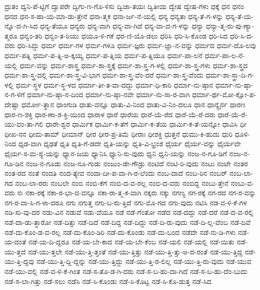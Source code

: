 {ದ್ರುತಂ
ದ್ವನಿ-ಪೆ-ಟ್ಟಿಗೆ
ದ್ವಾಪರೇ
ದ್ವಿಗು-ಣ-ಗೊ-ಳಿಸು
ದ್ವಿಜಾ-ತಯಃ
ದ್ವಿತೀಯ
ದ್ವೇಷ
ದ್ವೇಷ-ಗಳು
ಧಕ್ಕೆ
ಧನ
ಧನಂ
ಧನದ
ಧನ-ಸ-ಹಾ-ಯ-ಮಾ-ಡು-ತ್ತೇನೆ
ಧನಾ-ತ್ಮಕ
ಧನಾ-ರ್ಜ-ನೆ-ಯಲ್ಲಿ
ಧನ್ಯ
ಧನ್ಯತಾ
ಧನ್ಯ-ತೆ-ಗ-ಳನ್ನು
ಧನ್ಯ-ತೆ-ಯ-ನ್ನೊ-ದ-ಗಿ-ಸಿದ
ಧನ್ಯ-ತೆಯೂ
ಧನ್ಯರು
ಧನ್ಯ-ವಾಗಿ
ಧನ್ಯ-ವಾ-ಗಿದೆ
ಧನ್ಯ-ವಾ-ದ-ಗ-ಳನ್ನು
ಧನ್ಯಾ
ಧನ್ಯಾ-ತ್ಮ-ರು-ಪು-ಣ್ಯಾ-ತ್ಮರೂ
ಧನ್ವಂ-ತರಿ
ಧನ್ವಂ-ತ-ರಿಯು
ಧಯೂ-ಳಿ-ಗಕೆ
ಧರ-ಣಿ-ಯೊ-ಡಲು
ಧರಿಸಿ
ಧರಿ-ಸಿ-ಕೊಂಡ
ಧರಿ-ಸಿದ
ಧರಿ-ಸಿ-ದ-ವರು
ಧರಿ-ಸಿದ್ದು
ಧರ್ಮ
ಧರ್ಮ-ಗಳ
ಧರ್ಮ-ಗಳೂ
ಧರ್ಮ-ಜ್ಞರು
ಧರ್ಮ-ಜ್ಞಾ-ನ-ವನ್ನು
ಧರ್ಮದ
ಧರ್ಮ-ದೊ-ಲವು
ಧರ್ಮ-ಪತ್ನಿ
ಧರ್ಮ-ಪ-ತ್ನಿ-ಅ-ಕ್ಕಯ್ಯ
ಧರ್ಮ-ಪ-ತ್ನಿಯ
ಧರ್ಮ-ಪ-ತ್ನಿಯೂ
ಧರ್ಮ-ಪಾ-ಲನೆ
ಧರ್ಮ-ಪಾ-ಲ-ನೆ-ಯಲ್ಲಿ
ಧರ್ಮ-ವನ್ನು
ಧರ್ಮ-ಶಾಸ್ತ್ರ
ಧರ್ಮ-ಶಾ-ಸ್ತ್ರಕ್ಕೆ
ಧರ್ಮ-ಶಾ-ಸ್ತ್ರ-ಗ-ಳಲ್ಲಿ
ಧರ್ಮ-ಶಾ-ಸ್ತ್ರ-ಗಳು
ಧರ್ಮ-ಶಾ-ಸ್ತ್ರದ
ಧರ್ಮ-ಶಾ-ಸ್ತ್ರ-ದಲ್ಲಿ
ಧರ್ಮ-ಶಾ-ಸ್ತ್ರ-ವಿ-ಭಾಗ
ಧರ್ಮ-ಶಾ-ಸ್ತ್ರ-ವೆಂ-ದರೆ
ಧರ್ಮ-ಶಾ-ಸ್ತ್ರ-ವೆಂದು
ಧರ್ಮ-ಶಾ-ಸ್ತ್ರಾ-ದಿ-ಗ-ಳಲ್ಲಿ
ಧರ್ಮ-ಸ್ಥಳ
ಧರ್ಮ-ಸ್ಥ-ಳದ
ಧರ್ಮಾ-ತೀ-ತ-ವಾ-ದದ್ದು
ಧರ್ಮಾ-ಧಿ-ಕಾರಿ
ಧರ್ಮಾ-ನು-ಷ್ಠಾನ
ಧರ್ಮಾ-ನು-ಷ್ಠಾ-ನ-ಗ-ಳಿಗೆ
ಧರ್ಮಾ-ನು-ಷ್ಠಾ-ನ-ದಿಂದ
ಧರ್ಮಾ-ನು-ಷ್ಠಾ-ನವೇ
ಧರ್ಮಾ-ನು-ಸಾ-ರ-ವಾಗಿ
ಧರ್ಮಾ-ರ್ಥ-ಮೋ-ಕ್ಷೋ-ಪ-ದೇಷ್ಟಾ
ಧರ್ಮೋ-ತ್ಥಾನ
ಧಾಂಗುಡಿ
ಧಾತು-ವನ್ನೂ
ಧಾತು-ವಿ-ನಿಂದ
ಧಾತು-ವಿ-ನಿಂ-ದಲೂ
ಧಾನ
ಧಾನ್ಯೈರ್ನ
ಧಾರಣ
ಧಾರ-ಣ-ಶಕ್ತಿ
ಧಾರ-ಣಾ-ಶ-ಕ್ತಿ-ಯಿಂದ
ಧಾರಾಳ
ಧಾರೆ
ಧಾರೆಯ
ಧಾರೆ-ಯೆ-ರೆದ
ಧಾರೆ-ಯೆ-ರೆ-ದರು
ಧಾರೆ-ಯೆ-ರೆ-ಯು-ವಂ-ತಾ-ಗಲಿ
ಧಾರೇ-ಶ್ವರ
ಧಾರ್ಮಿಕ
ಧಾರ್ಮಿ-ಕ-ತೆಗೆ
ಧಾರ್ಮಿ-ಕ-ತೆಯ
ಧಾರ್ಮಿ-ಕ-ತೆ-ಯನ್ನೋ
ಧಾವಿಸಿ
ಧೀ
ಧೀಖ-ನನ
ಧೀಮ-ತಾಮ್
ಧೀಮಾನ್
ಧೀರ
ಧೀರ-ಪ್ರ-ತಿಮೆ
ಧೀರಾಃ
ಧೀಶಕ್ತಿ
ಧುತ್ತನೆ
ಧುಮು-ಕಿ-ಹುದು
ಧುರಿ
ಧೂಳಿ-ನಿಂದ
ಧೃಡ-ವಾಗಿ
ಧೃಢತೆ
ಧೃತಿ
ಧೃತಿ-ಗೆ-ಡದೇ
ಧೃತಿ-ಯನ್ನು
ಧೃತಿ-ವಿ-ಭ್ರಂಶ
ಧೈರ್ಯ
ಧೈರ್ಯ-ವನ್ನು
ಧೈರ್ಯವೇ
ಧೈರ್ಯ-ಸ-ಮ-ಸ್ಯೆ-ಯನ್ನು
ಧ್ಯಾನ-ಜಯ
ಧ್ಯಾನಿಸಿ
ಧ್ಯಾನಿ-ಸು-ವುದು
ಧ್ವನಿ
ಧ್ವನಿ-ಯನ್ನು
ನಂಜ-ನ-ಗೂ-ಡಿಗೆ
ನಂಜ-ನ-ಗೂ-ಡಿನ
ನಂಜ-ನ-ಗೂಡು
ನಂಜ-ನೂ-ಗುಡು
ನಂಜುಂ-ಡೇ-ಗೌಡ್ರು
ನಂಟಿದೆ
ನಂಟಿ-ರಿ-ವುದು
ನಂಟು
ನಂಟೇ
ನಂತರ
ನಂತ-ರದ
ನಂತೆ
ನಂದತಿ
ನಂದ-ತ್ಯೇವ
ನಂದಾ-ದೀ-ಪ-ವಾ-ಗಿ-ರ-ಲೆಂದು
ನಂಬ-ದಾದೆ
ನಂಬ-ರಿನ
ನಂಬರ್
ನಂಬ-ಲಾ-ಗದ
ನಂಬ-ಲಾ-ರರು
ನಂಬಲೇ
ನಂಬಿ
ನಂಬಿ-ಕೆಗೆ
ನಂಬಿ-ದ-ವ-ರಲ್ಲ
ನಂಬಿ-ದ-ವರು
ನಂಬಿದ್ದ
ನಂಬು-ತ್ತೇನೆ
ನಂಬು-ವ-ವರು
ನಃ
ನಕಾ-ರಕ್ಕೆ
ನಕಾ-ರ-ಭಾ-ವ-ವನ್ನೂ
ನಕಾ-ರಾ-ತ್ಮ-ಕ-ವಾಗಿ
ನಕ್ಕರು
ನಕ್ಕು
ನಗಣ್ಯ
ನಗ-ರಕ್ಕೆ
ನಗ-ರದ
ನಗ-ರ-ವನ್ನು
ನಗ-ರ-ವಾ-ಸಿ-ಗ-ಳಾ-ದರೂ
ನಗು
ನಗುತ್ತ
ನಗು-ಬ-ರು-ತ್ತಿದೆ
ನಗು-ಮೊ-ಗದ
ನಗು-ವುದು
ನಟಿಸಿ
ನಡ-ವ-ಳಿ-ಕೆ-ಗಳ
ನಡಿ-ಸು-ವು-ದರ
ನಡು-ವಿನ
ನಡುವೆ
ನಡು-ವೆಯೂ
ನಡೆ
ನಡೆ-ಗೆಂತೋ
ನಡೆದ
ನಡೆ-ದದ್ದು
ನಡೆ-ದರೆ
ನಡೆ-ದ-ವ-ರಲ್ಲಿ
ನಡೆ-ದಾ-ಡು-ತ್ತಾರೋ
ನಡೆ-ದಿತ್ತು
ನಡೆ-ದಿದೆ
ನಡೆ-ದಿದ್ದ
ನಡೆ-ದಿದ್ದು
ನಡೆ-ದಿ-ರು-ವುದು
ನಡೆ-ದಿ-ಲ್ಲ-ವೆಂಬ
ನಡೆ-ದಿವೆ
ನಡೆ-ದು-ಕೊಂ-ಡ-ವ-ರಲ್ಲ
ನಡೆ-ದು-ಕೊಂ-ಡಿರಿ
ನಡೆ-ದು-ಕೊಂಡು
ನಡೆ-ದು-ಬಂದ
ನಡೆದೇ
ನಡೆ-ನು-ಡಿ-ಗಳು
ನಡೆ-ಯ-ದಂತೆ
ನಡೆ-ಯ-ದಿ-ದ್ದರೂ
ನಡೆ-ಯ-ಬೇ-ಕಾದ
ನಡೆ-ಯ-ಬೇ-ಕೆಂಬ
ನಡೆ-ಯಲಿ
ನಡೆ-ಯಲ್ಲಿ
ನಡೆ-ಯಿತು
ನಡೆ-ಯು-ತ್ತದೆ
ನಡೆ-ಯು-ತ್ತಲೇ
ನಡೆ-ಯು-ತ್ತಿ-ತ್ತಂತೆ
ನಡೆ-ಯು-ತ್ತಿತ್ತು
ನಡೆ-ಯು-ತ್ತಿ-ತ್ತು-ಅ-ದ-ರಂತೆ
ನಡೆ-ಯು-ತ್ತಿದ್ದ
ನಡೆ-ಯು-ತ್ತಿ-ದ್ದವು
ನಡೆ-ಯು-ತ್ತಿ-ದ್ದಿ-ದ್ದನ್ನು
ನಡೆ-ಯು-ತ್ತಿದ್ದು
ನಡೆ-ಯು-ತ್ತಿ-ರ-ಲಿಲ್ಲ
ನಡೆ-ಯು-ತ್ತಿ-ರು-ವುದು
ನಡೆ-ಯುವ
ನಡೆ-ಯು-ವಲ್ಲಿ
ನಡೆ-ವ-ಳಿ-ಕೆ-ಗಿಂತ
ನಡೆ-ಸ-ತೊ-ಡ-ಗಿ-ದರು
ನಡೆ-ಸ-ಬ-ಹು-ದಾ-ಗಿದೆ
ನಡೆ-ಸ-ಬ-ಹು-ದೆಂ-ಬುದು
ನಡೆ-ಸ-ಲಾ-ಗಿತ್ತು
ನಡೆ-ಸಲು
ನಡೆಸಿ
ನಡೆ-ಸಿ-ಕೊಂಡು
ನಡೆ-ಸಿ-ಕೊಟ್ಟ
ನಡೆ-ಸಿ-ಕೊ-ಡುತ್ತ
ನಡೆ-ಸಿದ
}
